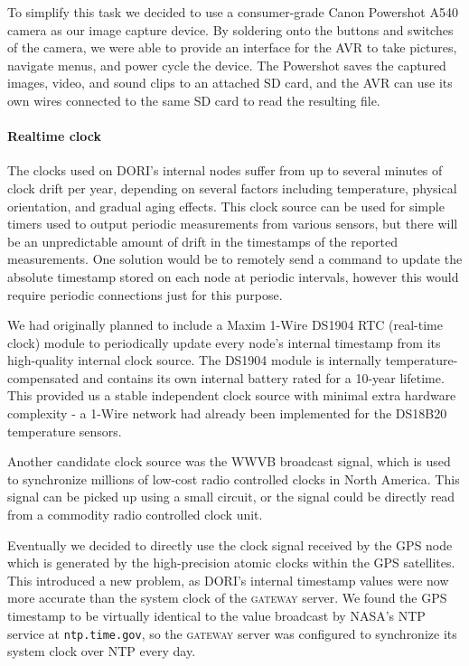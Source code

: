 \documentclass[12pt]{article}
\newcommand{\brand}{}
\begin{document}
    To simplify this task we decided to use a consumer-grade \brand{Canon Powershot A540} camera as our image capture device. By soldering onto the buttons and switches of the camera, we were able to provide an interface for the AVR to take pictures, navigate menus, and power cycle the device. The \brand{Powershot} saves the captured images, video, and sound clips to an attached SD card, and the AVR can use its own wires connected to the same SD card to read the resulting file.

    \paragraph*{Realtime clock}
    The clocks used on DORI's internal nodes suffer from up to several minutes of clock drift per year, depending on several factors including temperature, physical orientation, and gradual aging effects. This clock source can be used for simple timers used to output periodic measurements from various sensors, but there will be an unpredictable amount of drift in the timestamps of the reported measurements. One solution would be to remotely send a command to update the absolute timestamp stored on each node at periodic intervals, however this would require periodic connections just for this purpose.

    We had originally planned to include a \brand{Maxim 1-Wire DS1904} RTC (real-time clock) module to periodically update every node's internal timestamp from its high-quality internal clock source. The \brand{DS1904} module is internally temperature-compensated and contains its own internal battery rated for a 10-year lifetime. This provided us a stable independent clock source with minimal extra hardware complexity - a 1-Wire network had already been implemented for the \brand{DS18B20} temperature sensors.

    Another candidate clock source was the \brand{WWVB} broadcast signal, which is used to synchronize millions of low-cost radio controlled clocks in North America. This signal can be picked up using a small circuit, or the signal could be directly read from a commodity radio controlled clock unit.

    Eventually we decided to directly use the clock signal received by the GPS node which is generated by the high-precision atomic clocks within the GPS satellites. This introduced a new problem, as DORI's internal timestamp values were now more accurate than the system clock of the \textsc{gateway} server. We found the GPS timestamp to be virtually identical to the value broadcast by NASA's NTP service at \texttt{ntp.time.gov}, so the \textsc{gateway} server was configured to synchronize its system clock over NTP every day.
\end{document}
